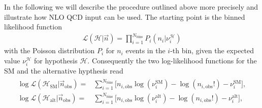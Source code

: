 \documentclass[preprint]{JHEP3} %
\newcommand{\SM}{\mathrm{SM}}
\newcommand{\alt}{\mathrm{alt}}
\def\HSM{\mathcal{H}_{\mathrm{SM}}}
\def\Halt{\mathcal{H}_{\mathrm{alt}}}
\newcommand{\be}{\begin{eqnarray}}
\newcommand{\ee}{\end{eqnarray}}
\begin{document}
In the following we will describe the procedure outlined above more precisely and illustrate how NLO QCD input can be used.
The starting point is the binned likelihood function 
\be
\label{lili}
   \mathcal{L}(\mathcal{H}|\vec{n}) = \prod_{i=1}^{N_\mathrm{bins}} P_i(n_i|\nu_{i}^\mathcal{H})
\ee
with the Poisson distribution $P_i$ for $n_i$ events in the $i$-th bin, given the expected value $\nu_{i}^\mathcal{H}$ for hypothesis $\mathcal{H}$. 
Consequently the two log-likelihood functions for the SM and the alternative hypthesis read
\be
\label{lilifunct}
\begin{split}
  \log\mathcal{L}(\HSM |\vec{n}_\mathrm{obs})  =& \sum_{i=1}^{N_\mathrm{bins}} \bigl[ n_{i,\mathrm{obs}}\log(\nu_i^{\SM}) -\log(n_{i,\mathrm{obs}}!) -\nu_i^{\SM}  \bigr], \\
  \log\mathcal{L}(\Halt|\vec{n}_\mathrm{obs})  =& \sum_{i=1}^{N_\mathrm{bins}} \bigl[ n_{i,\mathrm{obs}}\log(\nu_i^{\alt})-\log(n_{i,\mathrm{obs}}!) -\nu_i^{\alt} \bigr],
\end{split}
\ee
\end{document}
